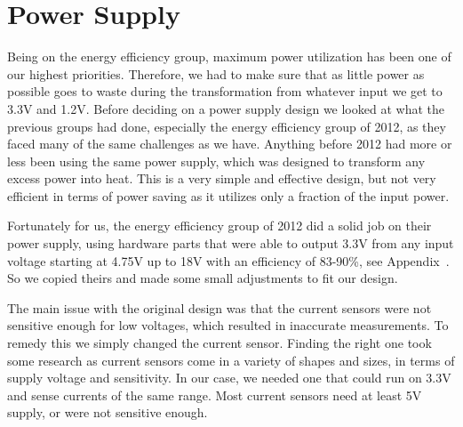 \section{Power Supply}

Being on the energy efficiency group, maximum power utilization has been one of our highest priorities. Therefore, we had to make sure that as little power as possible goes to waste during the transformation from whatever input we get to 3.3V and 1.2V. Before deciding on a power supply design we looked at what the previous groups had done, especially the energy efficiency group of 2012, as they faced many of the same challenges as we have. Anything before 2012 had more or less been using the same power supply, which was designed to transform any excess power into heat. This is a very simple and effective design, but not very efficient in terms of power saving as it utilizes only a fraction of the input power.

Fortunately for us, the energy efficiency group of 2012 did a solid job on their power supply, using hardware parts that were able to output 3.3V from any input voltage starting at 4.75V up to 18V with an efficiency of 83-90\%, see Appendix~. So we copied theirs and made some small adjustments to fit our design.

The main issue with the original design was that the current sensors were not sensitive enough for low voltages, which resulted in inaccurate measurements. To remedy this we simply changed the current sensor. Finding the right one took some research as current sensors come in a variety of shapes and sizes, in terms of supply voltage and sensitivity. In our case, we needed one that could run on 3.3V and sense currents of the same range. Most current sensors need at least 5V supply, or were not sensitive enough. 



  



	
